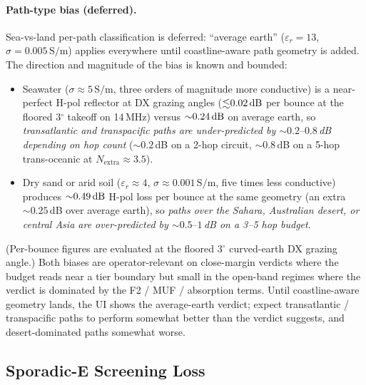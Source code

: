 \documentclass[11pt,a4paper]{article}
\newcommand{\SI}[2]{#1\,\text{#2}}
\newcommand{\dB}{\text{dB}}
\newcommand{\degree}{\ensuremath{{}^\circ}}
\begin{document}
\paragraph{Path-type bias (deferred).}  Sea-vs-land per-path
classification is deferred: ``average earth''
($\varepsilon_r = 13$, $\sigma = \SI{0.005}{S/m}$) applies
everywhere until coastline-aware path geometry is added.  The
direction and magnitude of the bias is known and bounded:
\begin{itemize}[nosep]
  \item Seawater ($\sigma \approx \SI{5}{S/m}$, three orders of
        magnitude more conductive) is a near-perfect H-pol
        reflector at DX grazing angles
        (${\lesssim}\SI{0.02}{\dB}$ per bounce at the floored
        $3\degree$ takeoff on 14\,MHz) versus
        ${\sim}\SI{0.24}{\dB}$ on average earth, so
        \emph{transatlantic and transpacific paths are
        under-predicted by ${\sim}0.2\text{--}0.8$\,dB depending
        on hop count} (${\sim}0.2$\,dB on a 2-hop circuit,
        ${\sim}0.8$\,dB on a 5-hop trans-oceanic at
        $N_{\text{extra}} \approx 3.5$).
  \item Dry sand or arid soil ($\varepsilon_r \approx 4$,
        $\sigma \approx \SI{0.001}{S/m}$, five times less
        conductive) produces ${\sim}\SI{0.49}{\dB}$ H-pol loss
        per bounce at the same geometry (an extra
        ${\sim}0.25$\,dB over average earth), so
        \emph{paths over the Sahara, Australian desert, or central
        Asia are over-predicted by ${\sim}0.5\text{--}1$\,dB on a
        3--5 hop budget}.
\end{itemize}
(Per-bounce figures are evaluated at the floored
$3\degree$ curved-earth DX grazing angle.)
Both biases are operator-relevant on close-margin verdicts where
the budget reads near a tier boundary but small in the open-band
regimes where the verdict is dominated by the F2 / MUF /
absorption terms. Until coastline-aware geometry lands, the UI
shows the average-earth verdict; expect transatlantic / transpacific
paths to perform somewhat better than the verdict suggests, and
desert-dominated paths somewhat worse.

\subsection{Sporadic-E Screening Loss}
\end{document}
